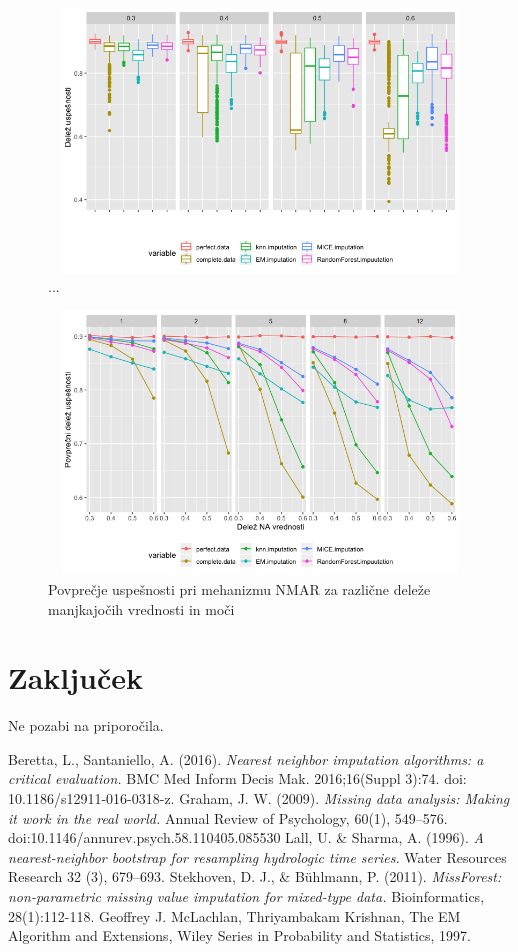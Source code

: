 \documentclass[12pt,a4paper]{article}
\begin{document}
\begin{figure}[ht]
	\centering
	\includegraphics[width= 12cm, height = 7cm]{img/NMAR_boxplot.png}
	\caption{...} 
	\label{fig:7}
\end{figure}


\begin{figure}[ht]
	\centering
	\includegraphics[width= 12cm, height = 7cm]{img/NMAR_mean_line.png}
	\caption{Povprečje uspešnosti pri mehanizmu NMAR za različne deleže manjkajočih vrednosti in moči} 
	\label{fig:8}
\end{figure}

\pagebreak
\section{Zaključek}

Ne pozabi na priporočila.

    
 

\newpage
\begin{thebibliography}{9}
Beretta, L., Santaniello, A. (2016).
\textit{Nearest neighbor imputation algorithms: a critical evaluation.}
BMC Med Inform Decis Mak. 2016;16(Suppl 3):74. doi: 10.1186/s12911-016-0318-z.
Graham, J. W. (2009). 
\textit{Missing data analysis: Making it work in the real world.} 
Annual Review of Psychology, 60(1), 549–576. doi:10.1146/annurev.psych.58.110405.085530 
Lall, U. \& Sharma, A. (1996).
\textit{A nearest-neighbor bootstrap for resampling hydrologic time series.}
Water Resources Research 32 (3), 679–693.
Stekhoven, D. J., \& Bühlmann, P. (2011).
\textit{MissForest: non-parametric missing value imputation for mixed-type data.}
Bioinformatics, 28(1):112-118.
Geoffrey J. McLachlan, Thriyambakam Krishnan, The EM
Algorithm and Extensions, Wiley Series in Probability and Statistics,
1997.
\end{thebibliography}
\end{document}
